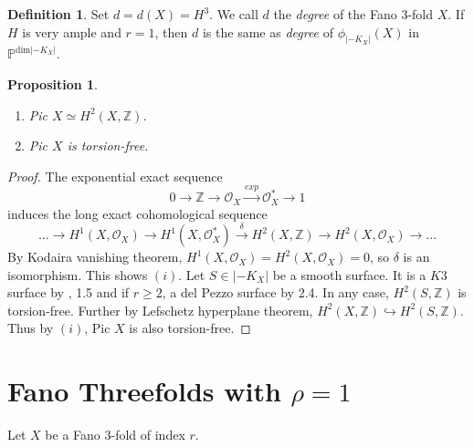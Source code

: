 \documentclass[11pt]{amsart}
\theoremstyle{plain}
\newtheorem{proposition}[theorem]{Proposition}
\theoremstyle{definition}
\newtheorem{definition}[theorem]{Definition}
\theoremstyle{expl}
\begin{document}
\begin{definition}
    Set $d = d(X) =H^3$. We call $d$ the \textit{degree} of the Fano $3$-fold $X$. If $H$ is very ample and $r=1$, then $d$ is the same as \textit{degree} of $\phi_{|-K_X|}(X)$ in $\mathbb{P}^{\text{dim}|-K_X|}$.
\end{definition}
\begin{proposition}
\label{pic}
	\begin{enumerate}
		\item[(i)] Pic $X \simeq H^2(X,\mathbb{Z})$.
		\item[(ii)] Pic $X$ is torsion-free. 
	\end{enumerate}
\end{proposition}
\begin{proof}
	The exponential exact sequence 
	\[
	0 \rightarrow \mathbb{Z} \rightarrow \mathcal{O}_X  \xrightarrow{exp} \mathcal{O}_X^* \rightarrow 1
	\]
	 induces the long exact cohomological sequence 
	 \[
	 \dots \rightarrow H^1(X,\mathcal{O}_X) \rightarrow H^1(X,\mathcal{O}_X^*) \xrightarrow{\delta} H^2(X,\mathbb{Z}) \rightarrow H^2(X,\mathcal{O}_X)\rightarrow \dots 
	 \]
	 By Kodaira vanishing theorem, $H^1(X,\mathcal{O}_X) = H^2(X,\mathcal{O}_X) =0$, so $\delta$ is an isomorphism. This shows $(i)$. Let $S \in |-K_X|$ be a smooth surface. It is a $K3$ surface by \cite{Isk77}, 1.5 and if $r \geq 2$, a del Pezzo surface by 2.4. In any case, $H^2(S,\mathbb{Z})$ is torsion-free. Further by Lefschetz hyperplane theorem, $H^2(X,\mathbb{Z}) \hookrightarrow H^2(S,\mathbb{Z})$. Thus by $(i)$, Pic $X$ is also torsion-free.
\end{proof}
 

	  
\section{Fano Threefolds with $\rho =1$}
Let $X$ be a Fano $3$-fold of index $r$.
\end{document}
